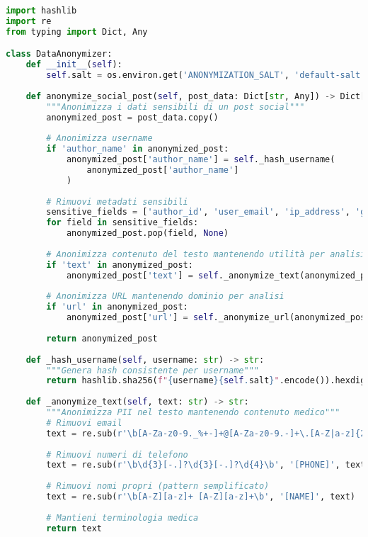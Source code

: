 \documentclass[12pt,a4paper]{report}
\begin{document}
\begin{lstlisting}[language=python, caption=Data Anonymization Service]
import hashlib
import re
from typing import Dict, Any

class DataAnonymizer:
    def __init__(self):
        self.salt = os.environ.get('ANONYMIZATION_SALT', 'default-salt')
    
    def anonymize_social_post(self, post_data: Dict[str, Any]) -> Dict[str, Any]:
        """Anonimizza i dati sensibili di un post social"""
        anonymized_post = post_data.copy()
        
        # Anonimizza username
        if 'author_name' in anonymized_post:
            anonymized_post['author_name'] = self._hash_username(
                anonymized_post['author_name']
            )
        
        # Rimuovi metadati sensibili
        sensitive_fields = ['author_id', 'user_email', 'ip_address', 'geolocation']
        for field in sensitive_fields:
            anonymized_post.pop(field, None)
        
        # Anonimizza contenuto del testo mantenendo utilità per analisi
        if 'text' in anonymized_post:
            anonymized_post['text'] = self._anonymize_text(anonymized_post['text'])
        
        # Anonimizza URL mantenendo dominio per analisi
        if 'url' in anonymized_post:
            anonymized_post['url'] = self._anonymize_url(anonymized_post['url'])
        
        return anonymized_post
    
    def _hash_username(self, username: str) -> str:
        """Genera hash consistente per username"""
        return hashlib.sha256(f"{username}{self.salt}".encode()).hexdigest()[:16]
    
    def _anonymize_text(self, text: str) -> str:
        """Anonimizza PII nel testo mantenendo contenuto medico"""
        # Rimuovi email
        text = re.sub(r'\b[A-Za-z0-9._%+-]+@[A-Za-z0-9.-]+\.[A-Z|a-z]{2,}\b', '[EMAIL]', text)
        
        # Rimuovi numeri di telefono
        text = re.sub(r'\b\d{3}[-.]?\d{3}[-.]?\d{4}\b', '[PHONE]', text)
        
        # Rimuovi nomi propri (pattern semplificato)
        text = re.sub(r'\b[A-Z][a-z]+ [A-Z][a-z]+\b', '[NAME]', text)
        
        # Mantieni terminologia medica
        return text
    

\end{lstlisting}
\end{document}
